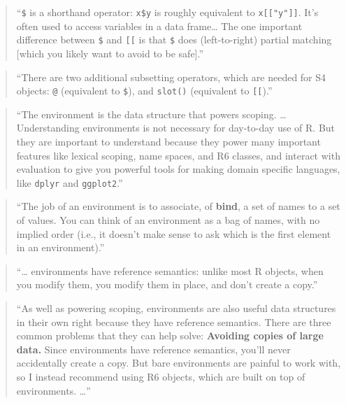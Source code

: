 \documentclass[]{tufte-book}
\begin{document}
\begin{quote}
``\texttt{\$} is a shorthand operator: \texttt{x\$y} is roughly equivalent to \texttt{x{[}{[}"y"{]}{]}}.
It's often used to access variables in a data frame\ldots{} The one important
difference between \texttt{\$} and \texttt{{[}{[}} is that \texttt{\$} does (left-to-right) partial
matching {[}which you likely want to avoid to be safe{]}.'' \citep{wickham2019advanced}
\end{quote}

\begin{quote}
``There are two additional subsetting operators, which are needed for
S4 objects: \texttt{@} (equivalent to \texttt{\$}), and \texttt{slot()} (equivalent to \texttt{{[}{[}}).''
\citep{wickham2019advanced}
\end{quote}

\begin{quote}
``The environment is the data structure that powers scoping. \ldots{} Understanding
environments is not necessary for day-to-day use of R. But they are important to
understand because they power many important features like lexical scoping,
name spaces, and R6 classes, and interact with evaluation to give you powerful
tools for making domain specific languages, like \texttt{dplyr} and \texttt{ggplot2}.''
\citep{wickham2019advanced}
\end{quote}

\begin{quote}
``The job of an environment is to associate, of \textbf{bind}, a set of names to a
set of values. You can think of an environment as a bag of names, with no
implied order (i.e., it doesn't make sense to ask which is the first element
in an environment).'' \citep{wickham2019advanced}
\end{quote}

\begin{quote}
``\ldots{} environments have reference semantics: unlike most R objects, when you
modify them, you modify them in place, and don't create a copy.'' \citep{wickham2019advanced}
\end{quote}

\begin{quote}
``As well as powering scoping, environments are also useful data structures in
their own right because they have reference semantics. There are three common
problems that they can help solve: \textbf{Avoiding copies of large data.} Since
environments have reference semantics, you'll never accidentally create a copy.
But bare environments are painful to work with, so I instead recommend using R6
objects, which are built on top of environments. \ldots{}'' \citep{wickham2019advanced}
\end{quote}
\end{document}
